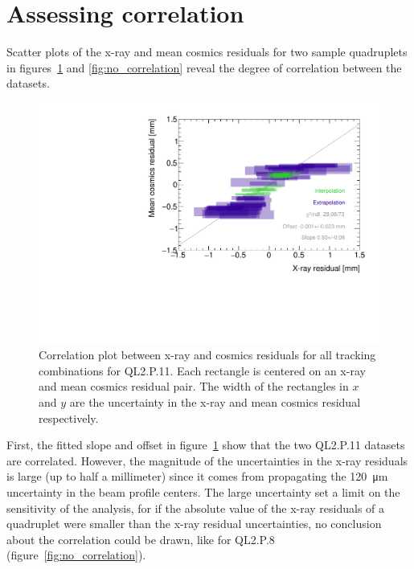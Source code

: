 \section{Assessing correlation}
Scatter plots of the x-ray and mean cosmics residuals for two sample quadruplets in figures~\ref{fig:correlation} and \ref{fig:no_correlation} reveal the degree of correlation between the datasets.

\begin{figure}
    \centering
    \includegraphics[width = \textwidth]{figures/figure_QL2P11_3100V_2021-08-05_QL2P11_local_cosmic_and_xray_data_correlation_plot.pdf}
    \caption{Correlation plot between x-ray and cosmics residuals for all tracking combinations for QL2.P.11. Each rectangle is centered on an x-ray and mean cosmics residual pair. The width of the rectangles in $x$ and $y$ are the uncertainty in the x-ray and mean cosmics residual respectively.}
    \label{fig:correlation}
\end{figure}

First, the fitted slope and offset in figure~\ref{fig:correlation} show that the two QL2.P.11 datasets are correlated. However, the magnitude of the uncertainties in the x-ray residuals is large (up to half a millimeter) since it comes from propagating the \SI{120}{\micro\meter} uncertainty in the beam profile centers. The large uncertainty set a limit on the sensitivity of the analysis, for if the absolute value of the x-ray residuals of a quadruplet were smaller than the x-ray residual uncertainties, no conclusion about the correlation could be drawn, like for QL2.P.8 (figure~\ref{fig:no_correlation}).

